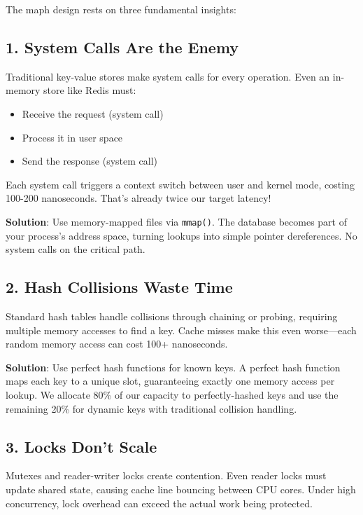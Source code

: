 \documentclass[11pt]{article}
\begin{document}
The maph design rests on three fundamental insights:

\subsection{1. System Calls Are the Enemy}

Traditional key-value stores make system calls for every operation. Even an in-memory store like Redis must:
\begin{itemize}
\item Receive the request (system call)
\item Process it in user space
\item Send the response (system call)
\end{itemize}

Each system call triggers a context switch between user and kernel mode, costing 100-200 nanoseconds. That's already twice our target latency!

\textbf{Solution}: Use memory-mapped files via \texttt{mmap()}. The database becomes part of your process's address space, turning lookups into simple pointer dereferences. No system calls on the critical path.

\subsection{2. Hash Collisions Waste Time}

Standard hash tables handle collisions through chaining or probing, requiring multiple memory accesses to find a key. Cache misses make this even worse—each random memory access can cost 100+ nanoseconds.

\textbf{Solution}: Use perfect hash functions for known keys. A perfect hash function maps each key to a unique slot, guaranteeing exactly one memory access per lookup. We allocate 80\% of our capacity to perfectly-hashed keys and use the remaining 20\% for dynamic keys with traditional collision handling.

\subsection{3. Locks Don't Scale}

Mutexes and reader-writer locks create contention. Even reader locks must update shared state, causing cache line bouncing between CPU cores. Under high concurrency, lock overhead can exceed the actual work being protected.
\end{document}
